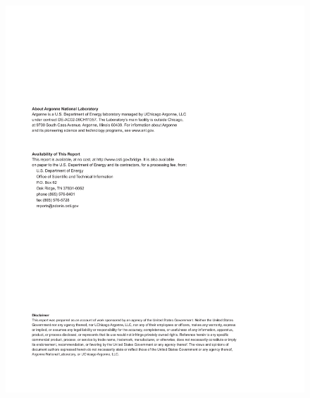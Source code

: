 \documentclass[twoside,11pt]{../sty/report_petsc}
\begin{document}
\begin{figure}[hbt]
\centerline{\includegraphics{titlepage2}}
\end{figure}


\cleardoublepage
\pagestyle{plain}

\vspace{1in}
\date{\today}



\cleardoublepage



\medskip \medskip

\cleardoublepage




\cleardoublepage

\tableofcontents
\end{document}
